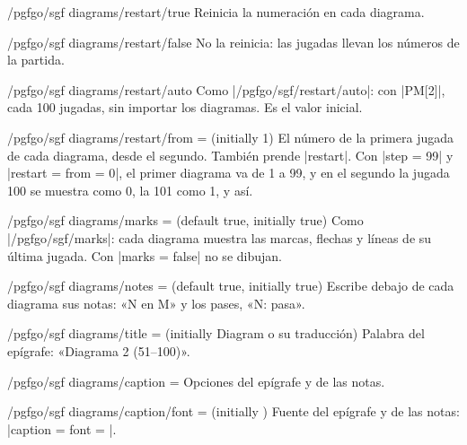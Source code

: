 
\begin{key}{/pgfgo/sgf diagrams/restart/true}
	Reinicia la numeración en cada diagrama.
\end{key}

\begin{key}{/pgfgo/sgf diagrams/restart/false}
	No la reinicia: las jugadas llevan los números de la partida.
\end{key}

\begin{key}{/pgfgo/sgf diagrams/restart/auto}
	Como |/pgfgo/sgf/restart/auto|: con |PM[2]|, cada 100 jugadas, sin importar los diagramas. Es el valor inicial.
\end{key}

\begin{key}{/pgfgo/sgf diagrams/restart/from =  (initially 1)}
	El número de la primera jugada de cada diagrama, desde el segundo. También prende |restart|. Con |step = 99| y |restart = {from = 0}|, el primer diagrama va de 1 a 99, y en el segundo la jugada 100 se muestra como 0, la 101 como 1, y así.
\end{key}

\begin{key}{/pgfgo/sgf diagrams/marks =  (default true, initially true)}
	Como |/pgfgo/sgf/marks|: cada diagrama muestra las marcas, flechas y líneas de su última jugada. Con |marks = false| no se dibujan.
\end{key}

\begin{key}{/pgfgo/sgf diagrams/notes =  (default true, initially true)}
	Escribe debajo de cada diagrama sus notas: «N en M» y los pases, «N: pasa».
\end{key}

\begin{key}{/pgfgo/sgf diagrams/title =  (initially Diagram o su traducción)}
	Palabra del epígrafe: «Diagrama 2 (51--100)».
\end{key}

\begin{key}{/pgfgo/sgf diagrams/caption = }
	Opciones del epígrafe y de las notas.
\end{key}

\begin{key}{/pgfgo/sgf diagrams/caption/font =  (initially \texttt{\string\small})}
	Fuente del epígrafe y de las notas: |caption = {font = \itshape}|.

	\begin{codeexample}
	\end{codeexample}

\end{key}

